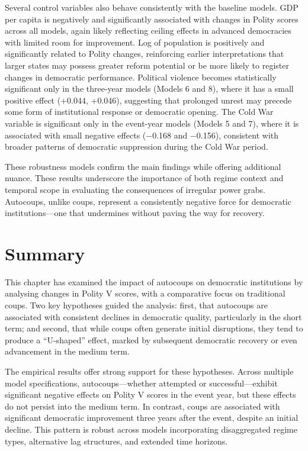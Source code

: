 \documentclass[
  12pt,
]{report}
\begin{document}
Several control variables also behave consistently with the baseline
models. GDP per capita is negatively and significantly associated with
changes in Polity scores across all models, again likely reflecting
ceiling effects in advanced democracies with limited room for
improvement. Log of population is positively and significantly related
to Polity changes, reinforcing earlier interpretations that larger
states may possess greater reform potential or be more likely to
register changes in democratic performance. Political violence becomes
statistically significant only in the three-year models (Models 6 and
8), where it has a small positive effect (+0.044, +0.046), suggesting
that prolonged unrest may precede some form of institutional response or
democratic opening. The Cold War variable is significant only in the
event-year models (Models 5 and 7), where it is associated with small
negative effects (−0.168 and −0.156), consistent with broader patterns
of democratic suppression during the Cold War period.

These robustness models confirm the main findings while offering
additional nuance. These results underscore the importance of both
regime context and temporal scope in evaluating the consequences of
irregular power grabs. Autocoups, unlike coups, represent a consistently
negative force for democratic institutions---one that undermines without
paving the way for recovery.

\section{Summary}\label{summary-3}

This chapter has examined the impact of autocoups on democratic
institutions by analysing changes in Polity V scores, with a comparative
focus on traditional coups. Two key hypotheses guided the analysis:
first, that autocoups are associated with consistent declines in
democratic quality, particularly in the short term; and second, that
while coups often generate initial disruptions, they tend to produce a
``U-shaped'' effect, marked by subsequent democratic recovery or even
advancement in the medium term.

The empirical results offer strong support for these hypotheses. Across
multiple model specifications, autocoups---whether attempted or
successful---exhibit significant negative effects on Polity V scores in
the event year, but these effects do not persist into the medium term.
In contrast, coups are associated with significant democratic
improvement three years after the event, despite an initial decline.
This pattern is robust across models incorporating disaggregated regime
types, alternative lag structures, and extended time horizons.
\end{document}
